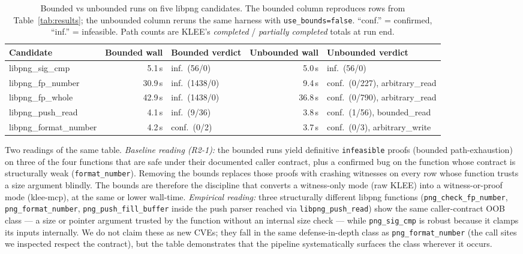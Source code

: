 \documentclass[3p,times,procedia]{elsarticle}
\begin{document}
\begin{table}[t]
\caption{Bounded vs unbounded runs on five libpng candidates. The bounded column reproduces rows from Table~\ref{tab:results}; the unbounded column reruns the same harness with \texttt{use\_bounds=false}. ``conf.'' = confirmed, ``inf.'' = infeasible. Path counts are KLEE's \emph{completed} / \emph{partially completed} totals at run end.}
\label{tab:baseline}
\scriptsize
\setlength{\tabcolsep}{3pt}
\begin{tabular*}{\hsize}{@{\extracolsep{\fill}}lrlrl@{}}
\toprule
\textbf{Candidate} & \textbf{Bounded wall} & \textbf{Bounded verdict} & \textbf{Unbounded wall} & \textbf{Unbounded verdict} \\
\midrule
libpng\_sig\_cmp        &  5.1\,s & inf.\ (56/0)     &  5.0\,s & inf.\ (56/0) \\
libpng\_fp\_number      & 30.9\,s & inf.\ (1438/0)   &  9.4\,s & conf.\ (0/227), arbitrary\_read \\
libpng\_fp\_whole       & 42.9\,s & inf.\ (1438/0)   & 36.8\,s & conf.\ (0/790), arbitrary\_read \\
libpng\_push\_read      &  4.1\,s & inf.\ (9/36)     &  3.8\,s & conf.\ (1/56), bounded\_read \\
libpng\_format\_number  &  4.2\,s & conf.\ (0/2)     &  3.7\,s & conf.\ (0/3), arbitrary\_write \\
\bottomrule
\end{tabular*}
\end{table}

Two readings of the same table. \emph{Baseline reading (R2-1):} the bounded runs yield definitive \texttt{infeasible} proofs (bounded path-exhaustion) on three of the four functions that are safe under their documented caller contract, plus a confirmed bug on the function whose contract is structurally weak (\texttt{format\_number}). Removing the bounds replaces those proofs with crashing witnesses on every row whose function trusts a size argument blindly. The bounds are therefore the discipline that converts a witness-only mode (raw KLEE) into a witness-or-proof mode (klee-mcp), at the same or lower wall-time. \emph{Empirical reading:} three structurally different libpng functions (\texttt{png\_check\_fp\_number}, \texttt{png\_format\_number}, \texttt{png\_push\_fill\_buffer} inside the push parser reached via \texttt{libpng\_push\_read}) show the same caller-contract OOB class --- a size or pointer argument trusted by the function without an internal size check --- while \texttt{png\_sig\_cmp} is robust because it clamps its inputs internally. We do not claim these as new CVEs; they fall in the same defense-in-depth class as \texttt{png\_format\_number} (the call sites we inspected respect the contract), but the table demonstrates that the pipeline systematically surfaces the class wherever it occurs.
\end{document}
